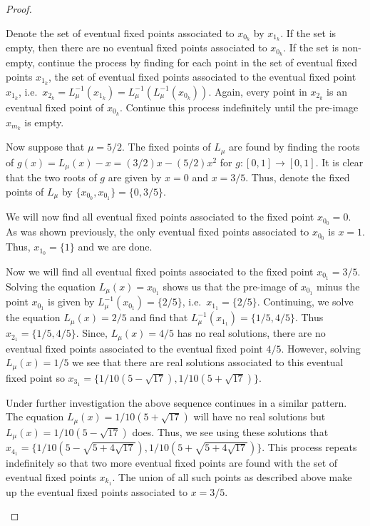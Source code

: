 \begin{proof}
\begin{enumerate}
      Denote the set of eventual fixed points associated to $x_{0_k}$ by $x_{1_k}$.
      If the set is empty, then there are no eventual fixed points associated to $x_{0_k}$.
      If the set is non-empty, continue the process by finding for each point in
      the set of eventual fixed points $x_{1_k}$, the set
      of eventual fixed points associated to the eventual fixed point $x_{1_k}$,
      i.e.\ $x_{2_k} = L_\mu^{-1}\left(x_{1_k}\right) = L_\mu^{-1}\left(L_\mu^{-1}\left(x_{0_k}\right)\right)$.
      Again, every point in $x_{2_k}$ is an eventual fixed point of $x_{0_k}$.
      Continue this process indefinitely until the pre-image $x_{m_k}$ is empty.

      Now suppose that $\mu = 5/2$. The fixed points of $L_\mu$ are found by finding
      the roots of $g(x) = L_\mu(x) - x = (3/2)x - (5/2)x^2$ for $g:[0, 1] \to [0, 1]$.
      It is clear that the two roots of $g$ are given by $x=0$
      and $x =3/5$. Thus, denote the fixed points of $L_\mu$ by $\{x_{0_0}, x_{0_1}\} = \{0, 3/5\}$.

      We will now find all eventual fixed points associated to the fixed point
      $x_{0_0} = 0$. As was shown previously, the only eventual fixed points associated to
      $x_{0_0}$ is $x = 1$. Thus, $x_{1_0} = \{1\}$ and we are done.

      Now we will find all eventual fixed points associated to the fixed point
      $x_{0_1} = 3/5$.  Solving the equation $L_\mu(x) = x_{0_1}$ shows us that the pre-image
      of $x_{0_1}$ minus the point $x_{0_1}$ is given by $L_\mu^{-1}\left(x_{0_1}\right) = \{2/5 \}$, i.e.\
      $x_{1_1} = \{2/5\}$. Continuing, we solve the equation $L_\mu(x) = 2/5$ and find that
      $L_\mu^{-1}(x_{1_1}) = \{1/5, 4/5\}$. Thus $x_{2_1} = \{1/5, 4/5\}$.
      Since, $L_\mu(x) =  4/5$ has no real solutions, there are no eventual fixed points associated to the eventual fixed point $4/5$.
      However, solving $L_\mu(x) =  1/5$ we see that there are real solutions associated to this eventual fixed point
      so $x_{3_1} = \{1/10 (5 - \sqrt{17}), 1/10 (5 + \sqrt{17})\}$.

      Under further investigation the above sequence continues in a similar pattern. The equation
      $L_\mu(x) =  1/10 (5 + \sqrt{17})$ will have no real solutions but
      $L_\mu(x) =  1/10 (5 - \sqrt{17})$ does. Thus, we see using these solutions that
      $x_{4_1} = \{1/10 (5 - \sqrt{5 + 4 \sqrt{17}}), 1/10 (5 +  \sqrt{5 + 4 \sqrt{17}})\}$.
      This process repeats indefinitely
      so that two more eventual fixed points are found with the set of eventual fixed points $x_{k_1}$.
      The union of all such points as described above  make up the eventual
      fixed points associated to $x = 3/5$.

  \end{enumerate}
\end{proof}
\newpage
